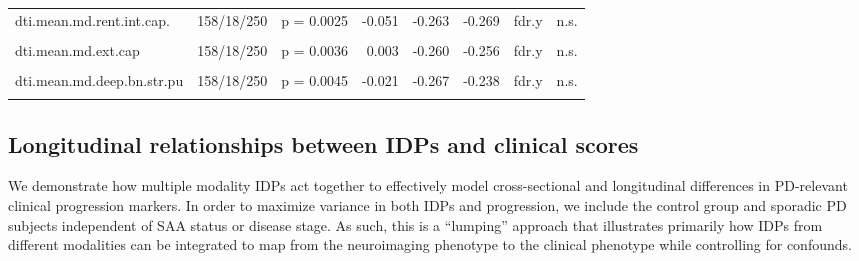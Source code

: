 \documentclass[
  table]{article}
\begin{document}
\begin{landscape}
\begin{table}
\begin{tabular}[t]{lllrrrll}
dti.mean.md.rent.int.cap. & 158/18/250 & p = 0.0025 & -0.051 & -0.263 & -0.269 & fdr.y & n.s.\\
\cellcolor{gray!22}{dti.fa.snc} & \cellcolor{gray!22}{158/18/250} & \cellcolor{gray!22}{p = 0.0033} & \cellcolor{gray!22}{-0.016} & \cellcolor{gray!22}{0.163} & \cellcolor{gray!22}{0.319} & \cellcolor{gray!22}{fdr.y} & \cellcolor{gray!22}{n.s.}\\
dti.mean.md.ext.cap & 158/18/250 & p = 0.0036 & 0.003 & -0.260 & -0.256 & fdr.y & n.s.\\
\cellcolor{gray!22}{dti.fa.bn.str.pu} & \cellcolor{gray!22}{158/18/250} & \cellcolor{gray!22}{p = 0.0039} & \cellcolor{gray!22}{-0.077} & \cellcolor{gray!22}{0.250} & \cellcolor{gray!22}{0.262} & \cellcolor{gray!22}{fdr.y} & \cellcolor{gray!22}{fdr.x}\\
\addlinespace
dti.mean.md.deep.bn.str.pu & 158/18/250 & p = 0.0045 & -0.021 & -0.267 & -0.238 & fdr.y & n.s.\\
\cellcolor{gray!22}{dti.mean.md.bn.str.pu} & \cellcolor{gray!22}{158/18/250} & \cellcolor{gray!22}{p = 0.0050} & \cellcolor{gray!22}{-0.019} & \cellcolor{gray!22}{-0.262} & \cellcolor{gray!22}{-0.238} & \cellcolor{gray!22}{fdr.y} & \cellcolor{gray!22}{n.s.}\\
\bottomrule
\end{tabular}
\end{table}
\end{landscape}

\subsection{Longitudinal relationships between IDPs and clinical
scores}\label{longitudinal-relationships-between-idps-and-clinical-scores}

We demonstrate how multiple modality IDPs act together to effectively
model cross-sectional and longitudinal differences in PD-relevant
clinical progression markers. In order to maximize variance in both IDPs
and progression, we include the control group and sporadic PD subjects
independent of SAA status or disease stage. As such, this is a
``lumping'' approach that illustrates primarily how IDPs from different
modalities can be integrated to map from the neuroimaging phenotype to
the clinical phenotype while controlling for confounds.
\end{document}
